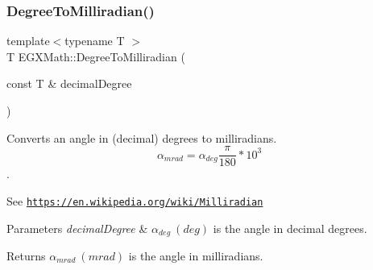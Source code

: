 \subsubsection{\texorpdfstring{Degree\+To\+Milliradian()}{DegreeToMilliradian()}}
{\footnotesize\ttfamily template$<$typename T $>$ \\
T E\+G\+X\+Math\+::\+Degree\+To\+Milliradian (\begin{DoxyParamCaption}\item[{const T \&}]{decimal\+Degree }\end{DoxyParamCaption})}



Converts an angle in (decimal) degrees to milliradians. \[\alpha_{mrad}=\alpha_{deg}\frac{\pi}{180}*10^3\]. 

See \href{https://en.wikipedia.org/wiki/Milliradian}{\tt https\+://en.\+wikipedia.\+org/wiki/\+Milliradian} 
\begin{DoxyParams}{Parameters}
{\em decimal\+Degree} & $\alpha_{deg}\ (deg)$ is the angle in decimal degrees. \\
\hline
\end{DoxyParams}
\begin{DoxyReturn}{Returns}
$\alpha_{mrad}\ (mrad)$ is the angle in milliradians. 
\end{DoxyReturn}
